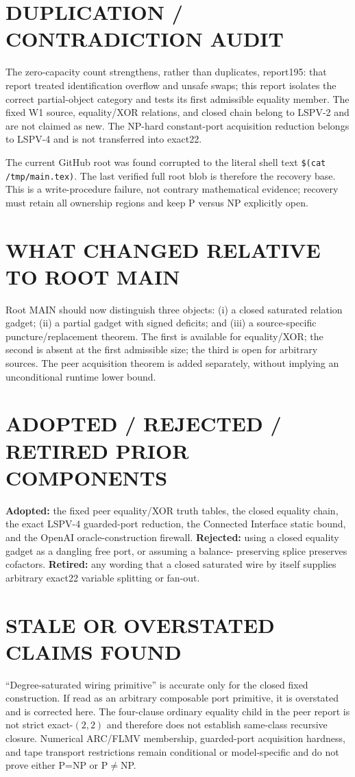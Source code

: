 \documentclass[11pt]{article}
\begin{document}
\section{DUPLICATION / CONTRADICTION AUDIT}
The zero-capacity count strengthens, rather than duplicates, report195: that
report treated identification overflow and unsafe swaps; this report isolates
the correct partial-object category and tests its first admissible equality
member. The fixed W1 source, equality/XOR relations, and closed chain belong to
LSPV-2 and are not claimed as new. The NP-hard constant-port acquisition
reduction belongs to LSPV-4 and is not transferred into exact22.

The current GitHub root was found corrupted to the literal shell text
\texttt{\$(cat /tmp/main.tex)}. The last verified full root blob is therefore
the recovery base. This is a write-procedure failure, not contrary
mathematical evidence; recovery must retain all ownership regions and keep P
versus NP explicitly open.

\section{WHAT CHANGED RELATIVE TO ROOT MAIN}
Root MAIN should now distinguish three objects: (i) a closed saturated
relation gadget; (ii) a partial gadget with signed deficits; and (iii) a
source-specific puncture/replacement theorem. The first is available for
equality/XOR; the second is absent at the first admissible size; the third is
open for arbitrary sources. The peer acquisition theorem is added separately,
without implying an unconditional runtime lower bound.

\section{ADOPTED / REJECTED / RETIRED PRIOR COMPONENTS}
\textbf{Adopted:} the fixed peer equality/XOR truth tables, the closed equality
chain, the exact LSPV-4 guarded-port reduction, the Connected Interface static
bound, and the OpenAI oracle-construction firewall. \textbf{Rejected:} using a
closed equality gadget as a dangling free port, or assuming a balance-
preserving splice preserves cofactors. \textbf{Retired:} any wording that a
closed saturated wire by itself supplies arbitrary exact22 variable splitting
or fan-out.

\section{STALE OR OVERSTATED CLAIMS FOUND}
``Degree-saturated wiring primitive'' is accurate only for the closed fixed
construction. If read as an arbitrary composable port primitive, it is
overstated and is corrected here. The four-clause ordinary equality child in
the peer report is not strict exact-$(2,2)$ and therefore does not establish
same-class recursive closure. Numerical ARC/FLMV membership, guarded-port
acquisition hardness, and tape transport restrictions remain conditional or
model-specific and do not prove either P=NP or P$\ne$NP.
\end{document}
